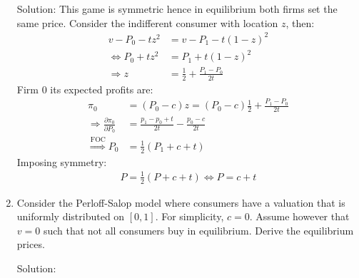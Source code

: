 \begin{enumerate}
	      Solution: This game is symmetric hence in equilibrium both firms set the same price.
	      Consider the indifferent consumer with location $z$, then:
	      \begin{align*}
		      v-P_0-tz^2                   & =v-P_1-t(1-z)^2                 \\
		      \Longleftrightarrow P_0+tz^2 & =P_1+t(1-z)^2                   \\
		      \Longrightarrow z            & =\frac{1}{2}+\frac{P_1-P_0}{2t}
	      \end{align*}
	      Firm 0 its expected profits are:
	      \begin{align*}
		      \pi_0                                             & =(P_0-c)z=(P_0-c)\frac{1}{2}+\frac{P_1-P_0}{2t} \\
		      \Longrightarrow\frac{\partial\pi_0}{\partial P_0} & =\frac{p_1-p_0+t}{2t}-\frac{p_0-c}{2t}          \\
		      \overset{\text{FOC}}{\Longrightarrow}P_0          & =\frac{1}{2}(P_1+c+t)
	      \end{align*}
	      Imposing symmetry:
	      \begin{align*}
		      P=\frac{1}{2}(P+c+t)\Longleftrightarrow P=c+t
	      \end{align*}
	\item Consider the Perloff-Salop model where consumers have a valuation that is uniformly
	      distributed on $[0, 1]$. For simplicity, $c = 0$. Assume however that $v = 0$ such
	      that not all consumers buy in equilibrium. Derive the equilibrium prices.

	      Solution: 
	  \end{enumerate}

